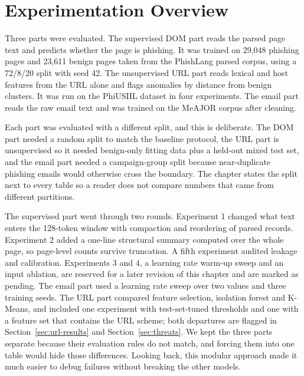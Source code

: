 \documentclass{FastFyp}
\begin{document}
\section{Experimentation Overview}
\label{sec:exp-overview}

Three parts were evaluated. The supervised DOM part reads the parsed page text and predicts whether the page is phishing. It was trained on 29{,}048 phishing pages and 23{,}611 benign pages taken from the PhishLang parsed corpus, using a 72/8/20 split with seed 42. The unsupervised URL part reads lexical and host features from the URL alone and flags anomalies by distance from benign clusters. It was run on the PhiUSIIL dataset in four experiments. The email part reads the raw email text and was trained on the MeAJOR corpus after cleaning.

Each part was evaluated with a different split, and this is deliberate. The DOM part needed a random split to match the baseline protocol, the URL part is unsupervised so it needed benign-only fitting data plus a held-out mixed test set, and the email part needed a campaign-group split because near-duplicate phishing emails would otherwise cross the boundary. The chapter states the split next to every table so a reader does not compare numbers that came from different partitions.

The supervised part went through two rounds. Experiment 1 changed what text enters the 128-token window with compaction and reordering of parsed records. Experiment 2 added a one-line structural summary computed over the whole page, so page-level counts survive truncation. A fifth experiment audited leakage and calibration. Experiments 3 and 4, a learning rate warm-up sweep and an input ablation, are reserved for a later revision of this chapter and are marked as pending. The email part used a learning rate sweep over two values and three training seeds. The URL part compared feature selection, isolation forest and K-Means, and included one experiment with test-set-tuned thresholds and one with a feature set that contains the URL scheme; both departures are flagged in Section~\ref{sec:url-results} and Section~\ref{sec:threats}. We kept the three parts separate because their evaluation rules do not match, and forcing them into one table would hide those differences. Looking back, this modular approach made it much easier to debug failures without breaking the other models.
\end{document}
